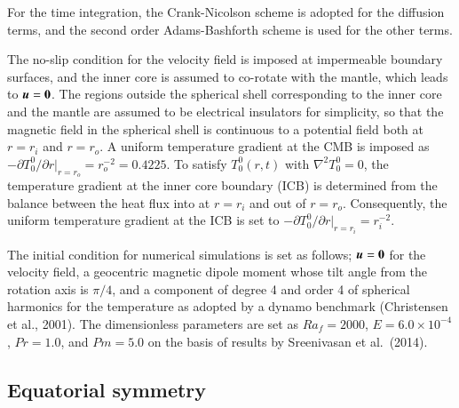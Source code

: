 For the time integration, the Crank-Nicolson scheme is adopted for the diffusion terms, and the second order Adams-Bashforth scheme is used for the other terms.

The no-slip condition for the velocity field is imposed at impermeable boundary surfaces, and the inner core is assumed to co-rotate with the mantle, which leads to $\mbox{\boldmath$u$} = {\bf 0}$.
The regions outside the spherical shell corresponding to the inner core and the mantle are assumed to be electrical insulators for simplicity, so that the magnetic field in the spherical shell is continuous to a potential field both at $r = r_i$ and $r = r_o$.
A
uniform temperature gradient at the CMB is imposed as $-\partial T_0^0 / \partial r |_{r = r_o} = r_{o}^{-2} = 0.4225$. 
To satisfy $T_0^0 (r, t)$ with $\nabla^2 T_0^0 = 0$,
the temperature gradient at the inner core boundary (ICB) is determined from the balance between the heat flux into at $r = r_i$ and out of $r = r_o$. 
Consequently, the uniform temperature gradient at the ICB is set to $-\partial T_0^0 / \partial r |_{r = r_i} = r_i^{-2}$.

The initial condition for numerical simulations is set as follows; $\mbox{\boldmath$u$} = {\bf 0}$ for the velocity field, a geocentric magnetic dipole moment whose tilt angle from the rotation axis is $\pi / 4$, and a component of degree 4 and order 4 of spherical harmonics for the temperature as adopted by a dynamo benchmark (Christensen et al., 2001).
The dimensionless parameters are set as $Ra_f = 2000$, $E = 6.0 \times 10^{-4}$, $Pr = 1.0$, and $Pm = 5.0$ on the basis of results by Sreenivasan et al.\ (2014).

\subsection{Equatorial symmetry}

